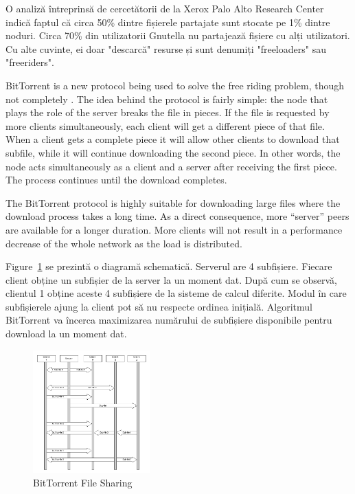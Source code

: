 O analiză întreprinsă de cercetătorii de la Xerox Palo Alto Research Center
indică faptul că circa 50\% dintre fișierele partajate sunt stocate pe 1\%
dintre noduri. Circa 70\% din utilizatorii Gnutella nu partajează fișiere cu
alți utilizatori. Cu alte cuvinte, ei doar "descarcă" resurse și sunt denumiți
"freeloaders" sau "freeriders".

BitTorrent is a new protocol being used to solve the free riding problem,
though not completely \cite{free-riding}. The idea behind the protocol is
fairly simple: the node that plays the role of the server breaks the file in
pieces. If the file is requested by more clients simultaneously, each client
will get a different piece of that file. When a client gets a complete piece
it will allow other clients to download that subfile, while it will continue
downloading the second piece. In other words, the node acts simultaneously as
a client and a server after receiving the first piece. The process continues
until the download completes.

The BitTorrent protocol is highly suitable for downloading large files where
the download process takes a long time. As a direct consequence, more
``server'' peers are available for a longer duration. More clients will not
result in a performance decrease of the whole network as the load is
distributed.

Figure~\ref{fig:p2p-systems:bittorrent-sharing} se prezintă o diagramă
schematică.  Serverul are 4 subfișiere. Fiecare client obține un subfișier de
la server la un moment dat.  După cum se observă, clientul 1 obține aceste 4
subfișiere de la sisteme de calcul diferite. Modul în care subfișierele ajung
la client pot să nu respecte ordinea inițială. Algoritmul BitTorrent va
încerca maximizarea numărului de subfișiere disponibile pentru download la un
moment dat.

\begin{figure}
  \centering
  \includegraphics[width=0.4\textwidth]{src/img/p2p-systems/bittorrent-sharing}
  \caption{BitTorrent File Sharing}
  \label{fig:p2p-systems:bittorrent-sharing}
\end{figure}


